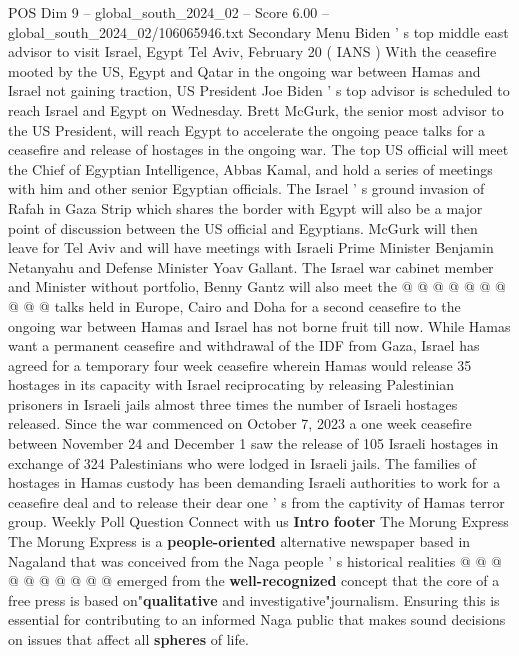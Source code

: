 \begin{textsample}{POS Dim 9 – global\_south\_2024\_02 – Score 6.00 – global\_south\_2024\_02/106065946.txt}  \label{ex:f9_pos_092}
Secondary Menu Biden ' s top middle east advisor to visit Israel, Egypt Tel Aviv, February 20 ( IANS ) With the ceasefire mooted by the US, Egypt and Qatar in the ongoing war between Hamas and Israel not gaining traction, US President Joe Biden ' s top advisor is scheduled to reach Israel and Egypt on Wednesday.
Brett McGurk, the senior most advisor to the US President, will reach Egypt to accelerate the ongoing peace talks for a ceasefire and release of hostages in the ongoing war.
The top US official will meet the Chief of Egyptian Intelligence, Abbas Kamal, and hold a series of meetings with him and other senior Egyptian officials.
The Israel ' s ground invasion of Rafah in Gaza Strip which shares the border with Egypt will also be a major point of discussion between the US official and Egyptians.
McGurk will then leave for Tel Aviv and will have meetings with Israeli Prime Minister Benjamin Netanyahu and Defense Minister Yoav Gallant.
The Israel war cabinet member and Minister without portfolio, Benny Gantz will also meet the @ @ @ @ @ @ @ @ @ @ talks held in Europe, Cairo and Doha for a second ceasefire to the ongoing war between Hamas and Israel has not borne fruit till now.
While Hamas want a permanent ceasefire and withdrawal of the IDF from Gaza, Israel has agreed for a temporary four week ceasefire wherein Hamas would release 35 hostages in its capacity with Israel reciprocating by releasing Palestinian prisoners in Israeli jails almost three times the number of Israeli hostages released.
Since the war commenced on October 7, 2023 a one week ceasefire between November 24 and December 1 saw the release of 105 Israeli hostages in exchange of 324 Palestinians who were lodged in Israeli jails.
The families of hostages in Hamas custody has been demanding Israeli authorities to work for a ceasefire deal and to release their dear one ' s from the captivity of Hamas terror group.
Weekly Poll Question Connect with us \textbf{Intro} \textbf{footer} The Morung Express The Morung Express is a \textbf{people-oriented} alternative newspaper based in Nagaland that was conceived from the Naga people ' s historical realities @ @ @ @ @ @ @ @ @ @ emerged from the \textbf{well-recognized} concept that the core of a free press is based on"\textbf{qualitative} and investigative"journalism.
Ensuring this is essential for contributing to an informed Naga public that makes sound decisions on issues that affect all \textbf{spheres} of life.

\end{textsample}
